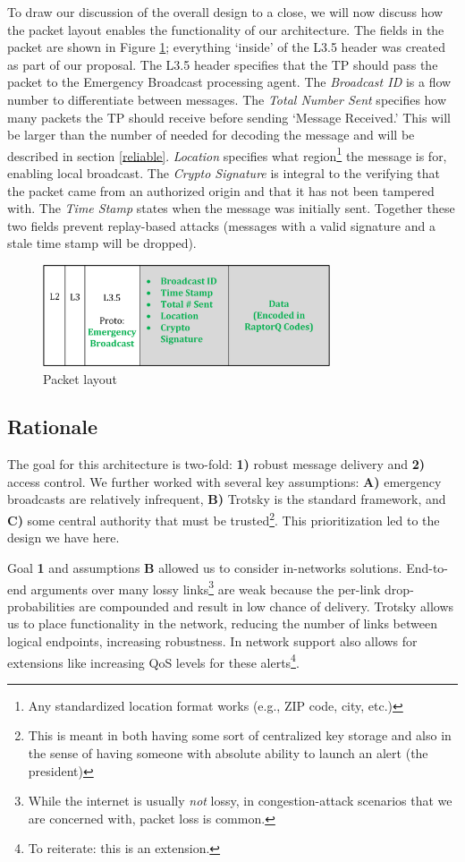 To draw our discussion of the overall design to a close, we will now discuss how the packet layout enables the functionality of our architecture. The fields in the packet are shown in Figure \ref{fig:pckt}; everything `inside' of the L3.5 header was created as part of our proposal. The L3.5 header specifies that the TP should pass the packet to the Emergency Broadcast processing agent. The\textit{ Broadcast ID} is a  flow number to differentiate between messages. The \textit{Total Number Sent} specifies how many packets the TP should receive before sending `Message Received.' This will be larger than the number of needed for decoding the message and will be described in section \ref{reliable}. \textit{Location} specifies what region\footnote{Any standardized location format works (e.g., ZIP code, city, etc.)} the message is for, enabling local broadcast. The \textit{Crypto Signature} is integral to the verifying that the packet came from an authorized origin and that it has not been tampered with. The \textit{Time Stamp} states when the message was initially sent. Together these two fields prevent replay-based attacks (messages with a valid signature and a stale time stamp will be dropped).
\begin{figure}[tp]
\centering
\includegraphics[width=8.5cm]{figures/packet_header_final.png}
\caption{Packet layout}
\label{fig:pckt}
\end{figure}

\subsection{Rationale}
The goal for this architecture is two-fold: \textbf{1)} robust message delivery and \textbf{2)} access control. We further worked with several key assumptions:  \textbf{A)} emergency broadcasts are relatively infrequent, \textbf{B)} Trotsky is the standard framework, and \textbf{C)} some central authority that must be trusted\footnote{This is meant in both having some sort of centralized key storage and also in the sense of having someone with absolute ability to launch an alert (the president)}. This prioritization led to the design we have here.  

Goal \textbf{1} and assumptions \textbf{B} allowed us to consider in-networks solutions. End-to-end arguments over many lossy links\footnote{While the internet is usually \textit{not} lossy, in congestion-attack scenarios that we are concerned with, packet loss is common.} are weak because the per-link drop-probabilities are compounded and result in low chance of delivery. Trotsky allows us to place functionality in the network, reducing the number of links between logical endpoints, increasing robustness. In network support also allows for extensions like increasing QoS levels for these alerts\footnote{To reiterate: this is an extension.}. 

